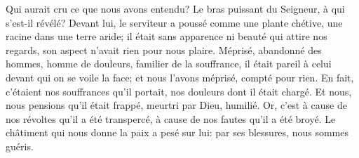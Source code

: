 Qui aurait cru ce que nous avons entendu?
Le bras puissant du Seigneur, à qui s’est-il révélé?
Devant lui, le serviteur a poussé comme une plante chétive,
	une racine dans une terre aride;
	il était sans apparence ni beauté qui attire nos regards,
	son aspect n’avait rien pour nous plaire.
Méprisé, abandonné des hommes, homme de douleurs, familier de la souffrance,
	il était pareil à celui devant qui on se voile la face;
	et nous l’avons méprisé, compté pour rien.
En fait, c’étaient nos souffrances qu’il portait, nos douleurs dont il était chargé.
	Et nous, nous pensions qu’il était frappé, meurtri par Dieu, humilié.
Or, c’est à cause de nos révoltes qu’il a été transpercé,
	à cause de nos fautes qu’il a été broyé.
Le châtiment qui nous donne la paix a pesé sur lui:
	par ses blessures, nous sommes guéris.
